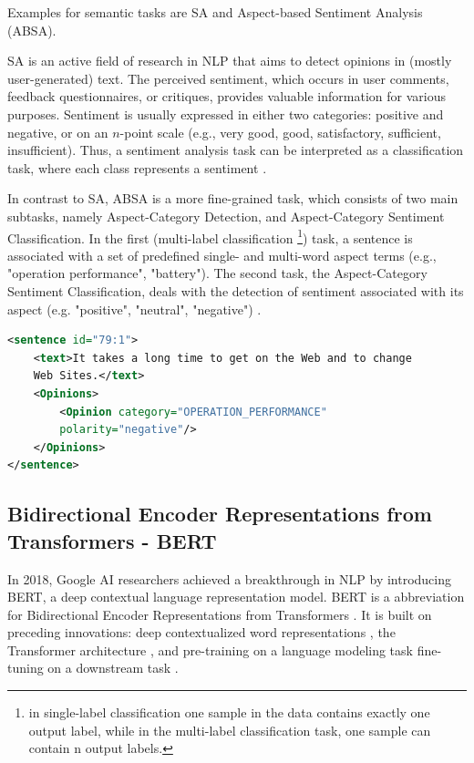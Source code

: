 Examples for semantic tasks are SA and Aspect-based Sentiment Analysis (ABSA). 

SA is an active field of research in NLP that aims to detect opinions in (mostly user-generated) text. The perceived sentiment, which occurs in user comments, feedback questionnaires, or critiques, provides valuable information for various purposes. Sentiment is usually expressed in either two categories: positive and negative, or on an $n$-point scale (e.g., very good, good, satisfactory, sufficient, insufficient). Thus, a sentiment analysis task can be interpreted as a classification task, where each class represents a sentiment \cite{prabowo2009sentiment}.

In contrast to SA, ABSA is a more fine-grained task, which consists of two main subtasks, namely Aspect-Category Detection, and Aspect-Category Sentiment Classification. In the first (multi-label classification \footnote{in single-label classification one sample in the data contains exactly one output label, while in the multi-label classification task, one sample can contain n output labels.}) task, a sentence is associated with a set of predefined single- and multi-word aspect terms (e.g., "operation performance", "battery"). The second task, the Aspect-Category Sentiment Classification, deals with the detection of sentiment associated with its aspect (e.g. "positive", "neutral", "negative") \cite{pavlopoulos2014aspect}.


\begin{lstlisting}[language=xml]
<sentence id="79:1">
    <text>It takes a long time to get on the Web and to change
    Web Sites.</text>
    <Opinions>
        <Opinion category="OPERATION_PERFORMANCE" 
        polarity="negative"/>
    </Opinions>
</sentence>

\end{lstlisting}



\subsection{Bidirectional Encoder Representations from Transformers - BERT}
    \label{sec:bert}
In 2018, Google AI researchers achieved a breakthrough in NLP by introducing BERT, a deep contextual language representation model. BERT is a abbreviation for Bidirectional Encoder Representations from Transformers \cite{devlin2018bert}. It is built on preceding innovations: deep contextualized word representations \cite{peters2018deep}, the Transformer architecture \cite{vaswani2017attention}, and pre-training on a language modeling task fine-tuning on a downstream task \cite{radford2018improving, howard2018universal}.


